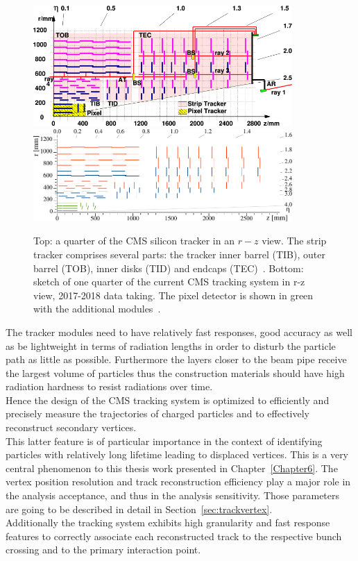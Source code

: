 \begin{figure}[h]
\centering
\includegraphics[width=0.88\textwidth]{Figures/c2/las}\\
\vspace{0.5cm}
\includegraphics[width=0.88\textwidth]{Figures/c2/Phase1_Tracker_1Quarter.pdf}
\vspace{0.5cm}

\caption{Top: a quarter of the CMS silicon tracker in an $r-z$
  view. The strip tracker comprises several parts: the tracker inner
  barrel (TIB), outer barrel (TOB), inner disks (TID) and endcaps
  (TEC)~\cite{Adam:1171503}. Bottom:
sketch of one quarter of the current CMS tracking system in
  r-z view, 2017-2018 data taking. The pixel detector is shown in
  green with the additional modules~\cite{trackingPU}.}
\label{fig:tracker}
\end{figure} 

The tracker modules need to have relatively fast responses, good
accuracy as well as be lightweight in terms of radiation lengths in
order to disturb the particle path as little as possible. Furthermore
the layers closer to the beam pipe receive
the largest volume of particles thus the construction materials should
have high radiation hardness to resist radiations over time.\\
Hence the design of the CMS tracking system is optimized to
efficiently and precisely measure the trajectories of charged
particles and to effectively reconstruct secondary vertices.\\
This latter feature is of particular
importance in the context of identifying particles with relatively
long lifetime leading to displaced vertices. This is a very central phenomenon
to this thesis work presented in Chapter~\ref{Chapter6}. The vertex position resolution and track
reconstruction efficiency play a major role in the analysis acceptance,
and thus in the analysis sensitivity. Those parameters are going to be
described in detail in Section~\ref{sec:trackvertex}.\\
Additionally the tracking system exhibits high granularity and
fast response features to correctly associate each reconstructed track
to the respective bunch crossing and to the primary interaction point.

